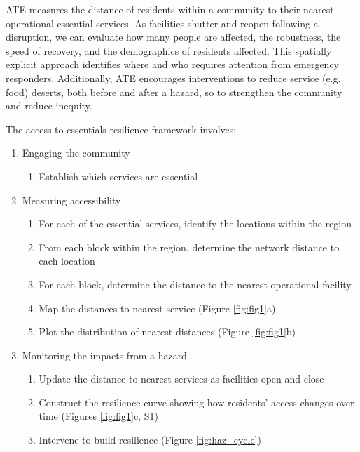 \documentclass[9pt,twocolumn,twoside,lineno]{pnas-new}
\begin{document}
ATE measures the distance of residents within a community to their nearest operational essential services. 
As facilities shutter and reopen following a disruption, we can evaluate how many people are affected, the robustness, the speed of recovery, and the demographics of residents affected. 
This spatially explicit approach identifies where and who requires attention from emergency responders. 
Additionally, ATE encourages interventions to reduce service (e.g. food) deserts, both before and after a hazard, so to strengthen the community and reduce inequity.

The access to essentials resilience framework involves: 
\begin{enumerate}[topsep=1pt,itemsep=0em,partopsep=1ex,parsep=1ex]
    \item Engaging the community 
    \begin{enumerate}[topsep=0pt,itemsep=-2pt,partopsep=1ex,parsep=1ex]
        \item Establish which services are essential
    \end{enumerate}
    \item Measuring accessibility
    \begin{enumerate}[topsep=0pt,itemsep=-2pt,partopsep=1ex,parsep=1ex]
        \item For each of the essential services, identify the locations within the region
        \item From each block within the region, determine the network distance to each location
        \item For each block, determine the distance to the nearest operational facility
        \item Map the distances to nearest service (Figure \ref{fig:fig1}a)
        \item Plot the distribution of nearest distances (Figure \ref{fig:fig1}b)
    \end{enumerate}
    \item Monitoring the impacts from a hazard
    \begin{enumerate}[topsep=0pt,itemsep=-2pt,partopsep=1ex,parsep=1ex]
        \item Update the distance to nearest services as facilities open and close
        \item Construct the resilience curve showing how residents' access changes over time (Figures \ref{fig:fig1}c, S1)
        \item Intervene to build resilience (Figure \ref{fig:haz_cycle})

\end{enumerate}
\end{enumerate}
\end{document}
